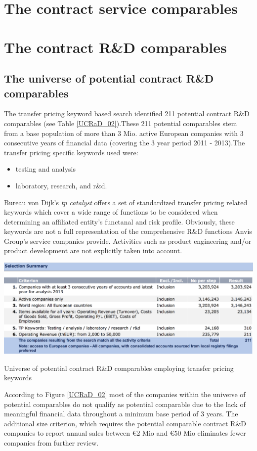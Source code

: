 \documentclass[12pt]{article}
\begin{document}
\section{The contract service comparables}
\section{The contract R\&D comparables}
\subsection{The universe of potential contract R\&D comparables }
The transfer pricing keyword based search identified 211 potential contract R\&D comparables (see Table \ref{UCRaD_02}).These 211 potential comparables stem from a base population of more than 3 Mio. active European companies with 3 consecutive years of financial data (covering the 3 year period 2011 - 2013).The transfer pricing specific keywords used were:\begin{itemize}
  \item testing and analysis
  \item laboratory, research, and r\&d.
\end{itemize} Bureau von Dijk's \emph{tp catalyst} offers a set of standardized transfer pricing related keywords which cover a wide range of functions to be considered when determining an affiliated entity's functanal and risk profile. Obviously, these keywords are not a full representation of the comprehensive R\&D functions Anvis Group's service companies provide. Activities such as product engineering and/or product development are not explicitly taken into account. 
\begin{table}[!hbtp]
\centering
\includegraphics[width=1.0\textwidth]{./UCRaD_02.eps}
\caption{\footnotesize Universe of potential contract R\&D comparables employing transfer pricing keywords}
\label{UCRaD_02}
\end{table}
According to Figure \ref{UCRaD_02} most of the companies within the universe of potential comparables do not qualify as potential comparable due to the lack of meaningful financial data throughout a minimum base period of 3 years. The additional size criterion, which requires the potential comparable contract R\&D companies to report annual sales between \euro 2 Mio and  \euro 50 Mio eliminates fewer companies from further review.\\[0.2cm]
\end{document}
